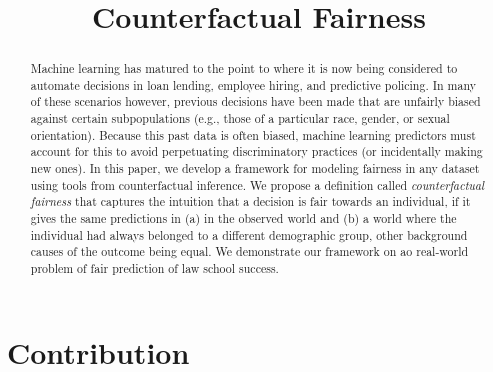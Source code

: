 \documentclass{article}
\title{Counterfactual Fairness}
\begin{document}
\maketitle




\begin{abstract} 
  Machine learning has matured to the point to where it is now being
  considered to automate decisions in loan lending, employee hiring,
  and predictive policing.  In many of these scenarios however,
  previous decisions have been made that are unfairly biased against
  certain subpopulations (e.g., those of a particular race, gender, or
  sexual orientation).  Because this past data is often biased,
  machine learning predictors must account for this to avoid
  perpetuating discriminatory practices (or incidentally making new
  ones).  In this paper, we develop a framework for modeling fairness
  in any dataset using tools from counterfactual inference. We propose
  a definition called \emph{counterfactual fairness} that captures the
  intuition that a decision is fair towards an individual, if it gives
  the same predictions in (a) in the observed world and (b) a world
  where the individual had always belonged to a different demographic
  group, other background causes of the outcome being equal. We
  demonstrate our framework on ao real-world problem of fair
  prediction of law school success.
\end{abstract} 

\section{Contribution}
\label{sec:introduction}

\end{document}
